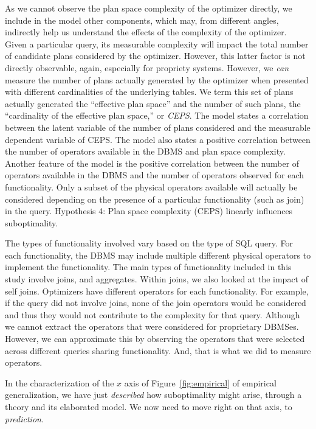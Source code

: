 As we cannot observe the plan space complexity of the optimizer
directly, we include in the model other components, which may, from
different angles, indirectly help us understand the effects of the
complexity of the optimizer. Given a particular query, its measurable
complexity will impact the total number of candidate plans considered
by the optimizer. However, this latter factor is not directly
observable, again, especially for propriety systems. However, we {\em
can} measure the number of plans actually generated by the optimizer
when presented with different cardinalities of the underlying tables.
We term this set of plans actually generated the ``effective plan
space'' and the number of such plans, the ``cardinality of the
effective plan space,'' or {\em CEPS}. The model states a correlation
between the latent variable of the number of plans considered and the
measurable dependent variable of CEPS. The model also states a
positive correlation between the number of operators available in the
DBMS and plan space complexity. Another feature of the model is the
positive correlation between the number of operators available in the
DBMS and the number of operators observed for each functionality. Only
a subset of the physical operators available will actually be
considered depending on the presence of a particular functionality
(such as join) in the query.
Hypothesis 4: Plan space complexity (CEPS) linearly influences suboptimality.

The types of functionality involved vary based on the type of SQL query. 
For each functionality, the DBMS may include multiple different physical operators
to implement the functionality. The main
types of functionality included in this study involve joins, and aggregates. 
Within joins, we also looked at the impact of self joins. Optimizers have
different operators for each functionality. For example, if the query did 
not involve joins, none of the join operators would be considered and thus
they would not contribute to the complexity for that query. Although we cannot
extract the operators that were considered for proprietary DBMSes. However, 
we can approximate this by observing the operators that were selected 
across different queries sharing functionality. And, that is what we did
to measure operators.

In the characterization of the $x$ axis of Figure~\ref{fig:empirical}
of empirical generalization, we have just {\em described} how
suboptimality might arise, through a theory and its elaborated model.
We now need to move right on that axis, to {\em prediction}.


